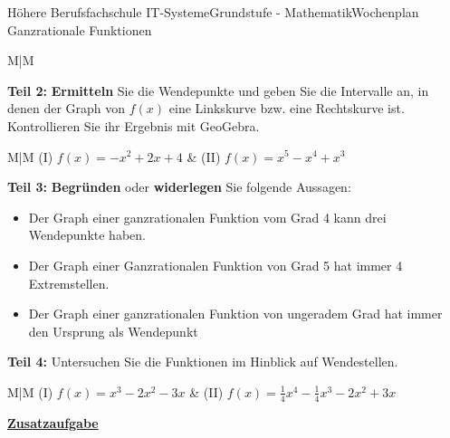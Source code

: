 \documentclass[oneside,openany,headings=optiontotoc,11pt,numbers=noenddot]{scrreprt}
\begin{document}
\begin{worksheet}{Höhere Berufsfachschule IT-Systeme}{Grundstufe - Mathematik}{Wochenplan Ganzrationale Funktionen}
\begin{framed}
\begin{tabularx}{\textwidth}{M|M}
			\end{tabularx}
		\end{framed}
		\begin{framed}
			\noindent
			\textbf{Teil 2:} \textbf{Ermitteln} Sie die Wendepunkte und geben Sie die Intervalle an, in denen der Graph von \(f(x)\) eine Linkskurve bzw. eine Rechtskurve ist.\\
			Kontrollieren Sie ihr Ergebnis mit GeoGebra.\\
			\par\noindent
			\renewcommand{\arraystretch}{1.5}
			\begin{tabularx}{\textwidth}{M|M}
				(I) \(f(x) = -x^2 + 2x + 4\) & (II) \(f(x) = x^5-x^4+x^3\)\\
				\hline
			\end{tabularx}
		\end{framed}
		\newpage
		\begin{framed}
			\noindent
			\textbf{Teil 3:} \textbf{Begründen} oder \textbf{widerlegen} Sie folgende Aussagen:
			\begin{itemize}[label=-]
				\item Der Graph einer ganzrationalen Funktion vom Grad 4 kann drei Wendepunkte haben.
				\item Der Graph einer Ganzrationalen Funktion von Grad 5 hat immer 4 Extremstellen.
				\item Der Graph einer ganzrationalen Funktion von ungeradem Grad hat immer den Ursprung als Wendepunkt
			\end{itemize}
		\end{framed}
		\begin{framed}
			\noindent
			\textbf{Teil 4:} Untersuchen Sie die Funktionen im Hinblick auf Wendestellen.\\
			\par\noindent
			\renewcommand{\arraystretch}{1.5}
			\begin{tabularx}{\textwidth}{M|M}
				(I) \(f(x) = x^3 - 2x^2 -3x\) & (II) \(f(x) = \frac{1}{4}x^4-\frac{1}{4}x^3 -2x^2 +3x\)\\
				\hline
				\multicolumn{2}{c}{(III) \(f(x) = -x^6 + 6x^4 -9x^2 + 4\)}
			\end{tabularx}
		\end{framed}
		\begin{framed}
			\noindent
			\textbf{\underline{Zusatzaufgabe}}\\
			\par\noindent

\end{framed}
\end{worksheet}
\end{document}
